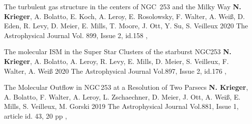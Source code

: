 \documentclass[%
    doublesided,
    paper=a4,
    fontsize=10pt
]{static/my-resume}
\begin{document}
    \publication
    {The turbulent gas structure in the centers of NGC~253 and the Milky Way} %
    {\textbf{N. Krieger}, A. Bolatto, E. Koch, A. Leroy, E. Rosolowsky, F. Walter, A. Wei\ss, D. Eden, R. Levy, D. Meier, E. Mills, T. Moore, J. Ott, Y. Su, S. Veilleux} %
    {2020} %
    {The Astrophysical Journal Vol. 899, Issue 2, id.158} %
    {, } %

    \publication
    {The molecular ISM in the Super Star Clusters of the starburst NGC253} %
    {\textbf{N. Krieger}, A. Bolatto, A. Leroy, R. Levy, E. Mills, D. Meier, S. Veilleux, F. Walter, A. Wei\ss} %
    {2020} %
    {The Astrophysical Journal Vol.897, Issue 2, id.176} %
    {, } %

    \publication
    {The Molecular Outflow in NGC\,253 at a Resolution of Two Parsecs} %
    {\textbf{N. Krieger}, A. Bolatto, F. Walter, A. Leroy, L. Zschaechner, D. Meier, J. Ott, A. Wei\ss, E. Mills, S. Veilleux, M. Gorski} %
    {2019} %
    {The Astrophysical Journal Vol.881, Issue 1, article id. 43, 20 pp} %
    {, } %
\end{document}
